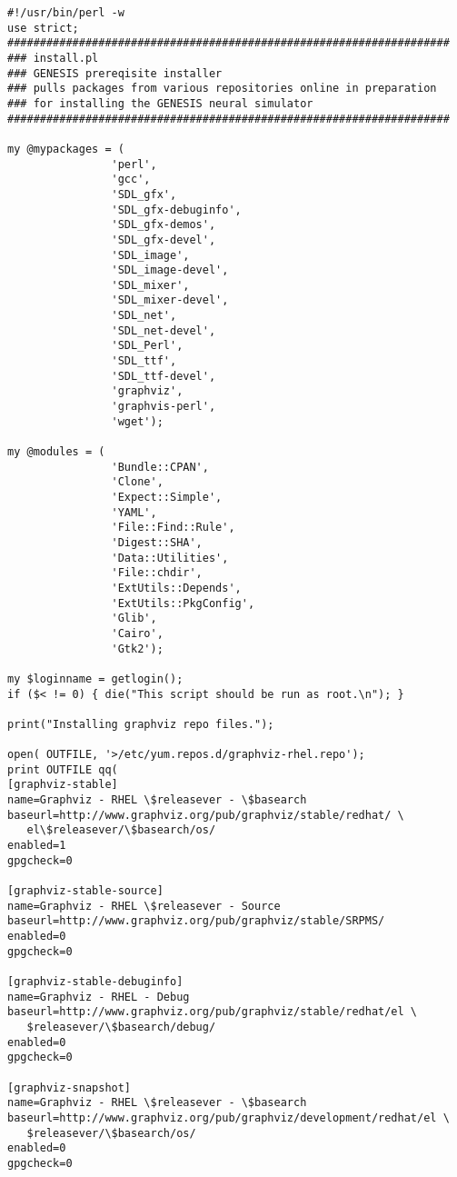 \documentclass[12pt]{article}
\begin{document}
\begin{verbatim}
#!/usr/bin/perl -w
use strict;
####################################################################
### install.pl
### GENESIS prereqisite installer
### pulls packages from various repositories online in preparation
### for installing the GENESIS neural simulator
####################################################################

my @mypackages = (
                'perl',
                'gcc',
                'SDL_gfx',
                'SDL_gfx-debuginfo',
                'SDL_gfx-demos',
                'SDL_gfx-devel',
                'SDL_image',
                'SDL_image-devel',
                'SDL_mixer',
                'SDL_mixer-devel',
                'SDL_net',
                'SDL_net-devel',
                'SDL_Perl',
                'SDL_ttf',
                'SDL_ttf-devel',
                'graphviz',
                'graphvis-perl',
                'wget');

my @modules = ( 
                'Bundle::CPAN',
                'Clone',
                'Expect::Simple',
                'YAML',
                'File::Find::Rule',
                'Digest::SHA',
                'Data::Utilities',
                'File::chdir',
                'ExtUtils::Depends',
                'ExtUtils::PkgConfig',
                'Glib',
                'Cairo',
                'Gtk2');

my $loginname = getlogin();
if ($< != 0) { die("This script should be run as root.\n"); }

print("Installing graphviz repo files.");

open( OUTFILE, '>/etc/yum.repos.d/graphviz-rhel.repo');
print OUTFILE qq(
[graphviz-stable]
name=Graphviz - RHEL \$releasever - \$basearch
baseurl=http://www.graphviz.org/pub/graphviz/stable/redhat/ \
   el\$releasever/\$basearch/os/
enabled=1
gpgcheck=0

[graphviz-stable-source]
name=Graphviz - RHEL \$releasever - Source
baseurl=http://www.graphviz.org/pub/graphviz/stable/SRPMS/
enabled=0
gpgcheck=0

[graphviz-stable-debuginfo]
name=Graphviz - RHEL - Debug
baseurl=http://www.graphviz.org/pub/graphviz/stable/redhat/el \
   $releasever/\$basearch/debug/
enabled=0
gpgcheck=0

[graphviz-snapshot]
name=Graphviz - RHEL \$releasever - \$basearch
baseurl=http://www.graphviz.org/pub/graphviz/development/redhat/el \
   $releasever/\$basearch/os/
enabled=0
gpgcheck=0


\end{verbatim}
\end{document}
